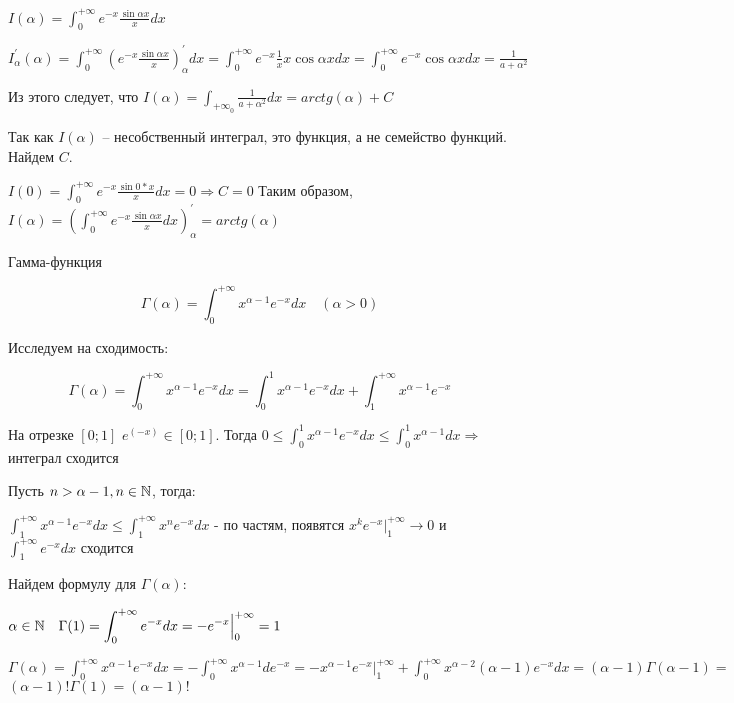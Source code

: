 \documentclass[12pt]{article}
\begin{document}
    \Ex $\displaystyle I(\alpha) = \int^{+\infty}_0 e^{-x} \frac{\sin\alpha x}{x}dx$

    $\displaystyle I^\prime_\alpha(\alpha) = \int^{+\infty}_0 \left(e^{-x} \frac{\sin\alpha x}{x}\right)^\prime_\alpha dx = \int^{+\infty}_0 e^{-x} \frac{1}{x} x \cos\alpha x dx =
    \int^{+\infty}_0 e^{-x} \cos\alpha x dx = \frac{1}{a + \alpha^2}$

    Из этого следует, что $\displaystyle I(\alpha) = \int_{+\infty}_{0} \frac{1}{a + \alpha^2} dx = arctg(\alpha) + C$

    Так как $I(\alpha)$ -- несобственный интеграл, это функция, а не семейство функций. Найдем $C$.

    $\displaystyle I(0) = \int^{+\infty}_0 e^{-x} \frac{\sin 0 * x}{x}dx = 0 \Longrightarrow C = 0$
    Таким образом, $\displaystyle I(\alpha) = \left(\int^{+\infty}_0 e^{-x} \frac{\sin\alpha x}{x} dx\right)^\prime_\alpha = arctg(\alpha)$

    \Ex Гамма-функция

    \[\Gamma(\alpha) = \int^{+\infty}_0 x^{\alpha - 1} e^{-x} dx \quad (\alpha > 0)\]

    Исследуем на сходимость:

    \[\Gamma(\alpha) = \int^{+\infty}_0 x^{\alpha - 1} e^{-x} dx = \int^{1}_0 x^{\alpha - 1} e^{-x} dx + \int^{+\infty}_1 x^{\alpha - 1} e^{-x}\]

    На отрезке $[0; 1]$ $e^(-x) \in [0;1]$.
    Тогда $\displaystyle 0 \leq \int^{1}_0 x^{\alpha - 1} e^{-x} dx \leq \int^{1}_0 x^{\alpha - 1} dx \Longrightarrow$ интеграл сходится

    Пусть $n > \alpha - 1, n \in \mathbb{N}$, тогда:

    $\displaystyle \int^{+\infty}_1 x^{\alpha - 1} e^{-x} dx \leq \int^{+\infty}_1 x^{n} e^{-x} dx$ - по частям, появятся $\displaystyle x^{k} e^{-x} \Big|^{+\infty}_1 \rightarrow 0$ и $\displaystyle \int^{+\infty}_1 e^{-x} dx$ сходится

    Найдем формулу для $\Gamma(\alpha)$:

    $\displaystyle \alpha \in \mathbb{N} \quad \Gamma(1) = \int^{+\infty}_0 e^{-x} dx = -e^{-x} \Big|^{+\infty}_{0} = 1$

    $\displaystyle \Gamma(\alpha) = \int^{+\infty}_0 x^{\alpha - 1} e^{-x} dx = -\int^{+\infty}_0 x^{\alpha - 1} de^{-x} = -x^{\alpha - 1}e^{-x} \Big|^{+\infty}_1 + \int^{+\infty}_0 x^{\alpha - 2} (\alpha - 1) e^{-x} dx = (\alpha - 1) \Gamma(\alpha - 1) = $
    $(\alpha - 1)! \Gamma(1) = (\alpha - 1)!$
\end{document}
